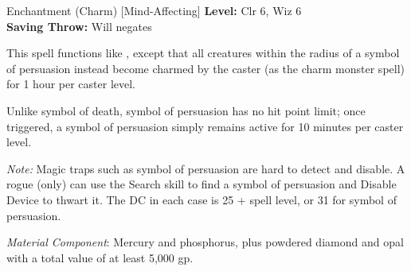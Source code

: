 {Enchantment (Charm) [Mind-Affecting]}
{
	\textbf{Level:}
	Clr 6, Wiz 6\\
	\textbf{Saving Throw:}
	Will negates\\
}
{
	This spell functions like , except that all creatures within the radius of a symbol of persuasion instead become charmed by the caster (as the charm monster spell) for 1 hour per caster level.

	Unlike symbol of death, symbol of persuasion has no hit point limit; once triggered, a symbol of persuasion simply remains active for 10 minutes per caster level.

	\textit{Note:} Magic traps such as symbol of persuasion are hard to detect and disable. A rogue (only) can use the Search skill to find a symbol of persuasion and Disable Device to thwart it. The DC in each case is 25 + spell level, or 31 for symbol of persuasion.

	\textit{Material Component}:
	Mercury and phosphorus, plus powdered diamond and opal with a total value of at least 5,000 gp.

}
